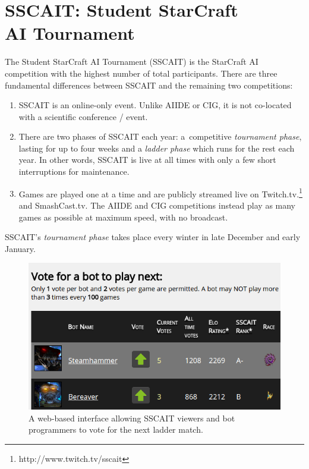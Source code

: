\section{SSCAIT: Student StarCraft\\ AI Tournament}\label{subsecSSCAIT}

The Student StarCraft AI Tournament (SSCAIT) is the StarCraft AI competition with the highest number of total participants. There are three fundamental differences between SSCAIT and the remaining two competitions:
\begin{enumerate}
  \item SSCAIT is an online-only event. Unlike AIIDE or CIG, it is not co-located with a scientific conference / event. \item There are two phases of SSCAIT each year: a~competitive {\em tournament phase}, lasting for up to four weeks and a {\em ladder phase} which runs for the rest each year. In other words, SSCAIT is live at all times with only a few short interruptions for maintenance.
  \item Games are played one at a time and are publicly streamed live on Twitch.tv.\footnote{http://www.twitch.tv/sscait} and SmashCast.tv. The AIIDE and CIG competitions instead play as many games as possible at maximum speed, with no broadcast.
\end{enumerate}

SSCAIT's {\em tournament phase} takes place every winter in late December and early January. 

\begin{figure}[t]
  \centering
  \includegraphics[width=1\columnwidth]{fig/sscait-voting.png}
  \caption{A web-based interface allowing SSCAIT viewers and bot programmers to vote for the next ladder match.}
  \label{figSSCAITvoting}
\end{figure}

